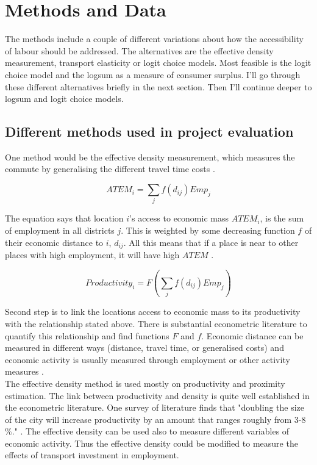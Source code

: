 \section{Methods and Data}

The methods include a couple of different variations about how the accessibility of labour should be addressed. The alternatives are the effective density measurement, transport elasticity or logit choice models. Most feasible is the logit choice model and the logsum as a measure of consumer surplus. I'll go through these different alternatives briefly in the next section. Then I'll continue deeper to logsum and logit choice models.

\subsection{Different methods used in project evaluation}

One method would be the effective density measurement, which measures the commute by generalising the different travel time costs \citep{venables2017}. 

\begin{equation}
ATEM_i = \sum_j f(d_{ij})Emp_j
\end{equation}

The equation says that location $i$'s access to economic mass $ATEM_i$, is the sum of employment in all districts $j$. This is weighted by some decreasing function $f$ of their economic distance to $i$, $d_{ij}$. All this means that if a place is near to other places with high employment, it will have high $ATEM$ \citep{venables2017}.  

\begin{equation}
Productivity_i = F(\sum_j f(d_{ij})Emp_j)
\end{equation}

Second step is to link the locations access to economic mass to its productivity with the relationship stated above. There is substantial econometric literature to quantify this relationship and find functions $F$ and $f$. Economic distance can be measured in different ways (distance, travel time, or generalised costs) and economic activity is usually measured through employment or other activity measures \citep{venables2017}.\\

The effective density method is used mostly on productivity and proximity estimation. The link between productivity and density is quite well established in the econometric literature. One survey of literature finds that "doubling the size of the city will increase productivity by an amount that ranges roughly from 3-8 $\%$." \citep[p. 2133]{rosenthal}.   The effective density can be used also to measure different variables of economic activity. Thus the effective density could be modified to measure the effects of transport investment in employment. \\

